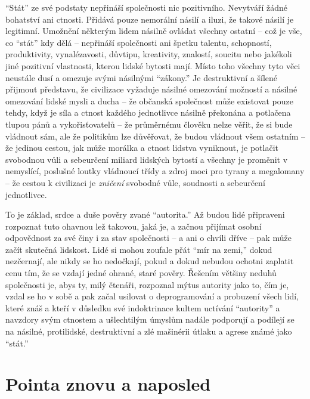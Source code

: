 \documentclass{book}
\begin{document}
\enquote{Stát} ze své podstaty nepřináší společnosti nic pozitivního. Nevytváří žádné bohatství ani ctnosti. Přidává pouze nemorální násilí a iluzi, že takové násilí je legitimní. Umožnění některým lidem násilně ovládat všechny ostatní -- což je vše, co \enquote{stát} kdy dělá -- nepřináší společnosti ani špetku talentu, schopností, produktivity, vynalézavosti, důvtipu, kreativity, znalostí, soucitu nebo jakékoli jiné pozitivní vlastnosti, kterou lidské bytosti mají. Místo toho všechny tyto věci neustále dusí a omezuje svými násilnými \enquote{zákony.} Je destruktivní a šílené přijmout představu, že civilizace vyžaduje násilné omezování možností a násilné omezování lidské mysli a ducha -- že občanská společnost může existovat pouze tehdy, když je síla a ctnost každého jednotlivce násilně překonána a potlačena tlupou pánů a vykořisťovatelů -- že průměrnému člověku nelze věřit, že si bude vládnout sám, ale že politikům lze důvěřovat, že budou vládnout všem ostatním -- že jedinou cestou, jak může morálka a ctnost lidstva vyniknout, je potlačit svobodnou vůli a sebeurčení miliard lidských bytostí a všechny je proměnit v nemyslící, poslušné loutky vládnoucí třídy a zdroj moci pro tyrany a megalomany -- že cestou k civilizaci je \emph{zničení} svobodné vůle, soudnosti a sebeurčení jednotlivce.

To je základ, srdce a duše pověry zvané \enquote{autorita.} Až budou lidé připraveni rozpoznat tuto ohavnou lež takovou, jaká je, a začnou přijímat osobní odpovědnost za své činy i za stav společnosti -- a ani o chvíli dříve -- pak může začít skutečná lidskost. Lidé si mohou zoufale přát \enquote{mír na zemi,} dokud nezčernají, ale nikdy se ho nedočkají, pokud a dokud nebudou ochotni zaplatit cenu tím, že se vzdají jedné ohrané, staré pověry. Řešením většiny neduhů společnosti je, abys ty, milý čtenáři, rozpoznal mýtus autority jako to, čím je, vzdal se ho v sobě a pak začal usilovat o deprogramování a probuzení všech lidí, které znáš a kteří v důsledku své indoktrinace kultem uctívání \enquote{autority} a navzdory svým ctnostem a ušlechtilým úmyslům nadále podporují a podílejí se na násilné, protilidské, destruktivní a zlé mašinérii útlaku a agrese známé jako \enquote{stát.}

\section{Pointa znovu a naposled}
\end{document}
